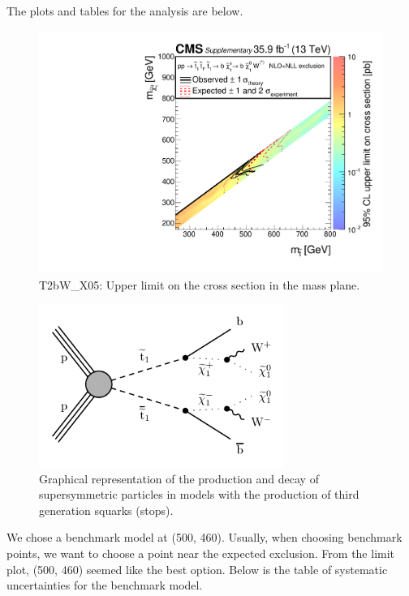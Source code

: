 The plots and tables for the analysis are below.

\begin{figure}[htbp]
\centering
\includegraphics[width=120mm]{./sec31/T2bW/T2bW_X05XSEC.pdf}
\caption{T2bW\_X05: Upper limit on the cross section in the mass plane.}
\end{figure}


\begin{figure}[htbp]
\centering
\includegraphics[width=80mm]{./sec31/T2bW/T2bW_Feynman.pdf}
\caption{Graphical representation of the production and decay of supersymmetric particles in models with the production of third generation squarks (stops).}
\end{figure}

We chose a benchmark model at (500, 460). Usually, when choosing benchmark points, we want to choose a point near the expected exclusion. From the limit plot, (500, 460) seemed like the best option. Below is the table of systematic uncertainties for the benchmark model.

